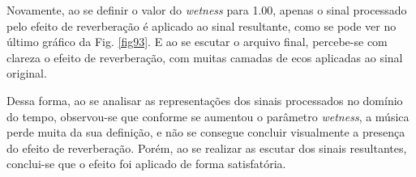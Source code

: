 
Novamente, ao se definir o valor do \textit{wetness} para 1.00, apenas o sinal processado pelo efeito de reverberação é aplicado ao sinal resultante, como se pode ver no último gráfico da Fig. \ref{fig93}. E ao se escutar o arquivo final, percebe-se com clareza o efeito de reverberação, com muitas camadas de ecos aplicadas ao sinal original.


Dessa forma, ao se analisar as representações dos sinais processados no domínio do tempo, observou-se que conforme se aumentou o parâmetro \textit{wetness}, a música perde muita da sua definição, e não se consegue concluir visualmente a presença do efeito de reverberação. Porém, ao se realizar as escutar dos sinais resultantes, conclui-se que o efeito foi aplicado de forma satisfatória.